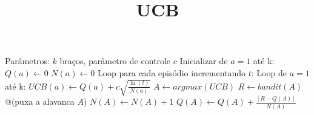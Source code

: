 \documentclass[brazilian,preview]{standalone}
\title{UCB}
\begin{document}
\begin{algorithm}
Parâmetros: $k$ braços, parâmetro de controle $c$
Inicializar de $a=1$ até k:
    $Q(a) \leftarrow 0$ 
    $N(a) \leftarrow 0$ 
Loop para cada episódio incrementando $t$:
    Loop de $a=1$ até k:
        $UCB(a) \leftarrow Q(a) + c \sqrt{\frac{\ln(t)}{N(a)}}$ 
    $A \leftarrow argmax(UCB)$ 
    $R \leftarrow bandit(A)$ @\hfill@ (puxa a alavanca $A$)
    $N(A) \leftarrow N(A) + 1$
    $Q(A) \leftarrow Q(A) + \frac{[R - Q(A)]}{N(A)}$
\end{algorithm}
\end{document}
